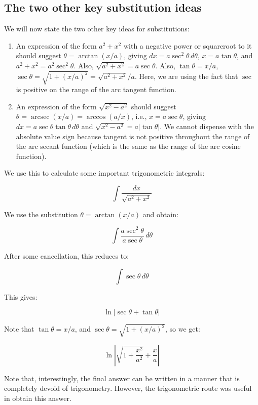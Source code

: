 \documentclass[10pt]{amsart}
\begin{document}
\subsection{The two other key substitution ideas}

We will now state the two other key ideas for substitutions:

\begin{enumerate}
\item An expression of the form $a^2 + x^2$ with a negative power or
  squareroot to it should suggest $\theta = \arctan(x/a)$, giving $dx
  = a \sec^2 \theta \, d\theta$, $x = a \tan \theta$, and $a^2 + x^2 =
  a^2 \sec^2 \theta$. Also, $\sqrt{a^2 + x^2} = a \sec \theta$. Also,
  $\tan \theta = x/a$, $\sec \theta = \sqrt{1 + (x/a)^2} = \sqrt{a^2 +
  x^2}/a$. Here, we are using the fact that $\sec$ is positive on the
  range of the arc tangent function.
\item An expression of the form $\sqrt{x^2 - a^2}$ should suggest
  $\theta = \operatorname{arcsec}(x/a) = \arccos(a/x)$, i.e., $x = a
  \sec \theta$, giving $dx = a \sec \theta \tan \theta \, d\theta$ and
  $\sqrt{x^2 - a^2} = a|\tan \theta|$. We cannot dispense with the
  absolute value sign because tangent is not positive throughout the
  range of the arc secant function (which is the same as the range of
  the arc cosine function).
\end{enumerate}

We use this to calculate some important trigonometric integrals:

$$\int \frac{dx}{\sqrt{a^2 + x^2}}$$

We use the substitution $\theta = \arctan(x/a)$ and obtain:

$$\int \frac{a \sec^2 \theta}{a \sec \theta} \, d\theta$$

After some cancellation, this reduces to:

$$\int \sec \theta \, d \theta$$

This gives:

$$\ln|\sec \theta + \tan \theta|$$

Note that $\tan \theta = x/a$, and $\sec \theta = \sqrt{1 + (x/a)^2}$,
so we get:

$$\ln\left|\sqrt{1 + \frac{x^2}{a^2}} + \frac{x}{a} \right|$$

Note that, interestingly, the final answer can be written in a manner
that is completely devoid of trigonometry. However, the trigonometric
route was useful in obtain this answer.
\end{document}
